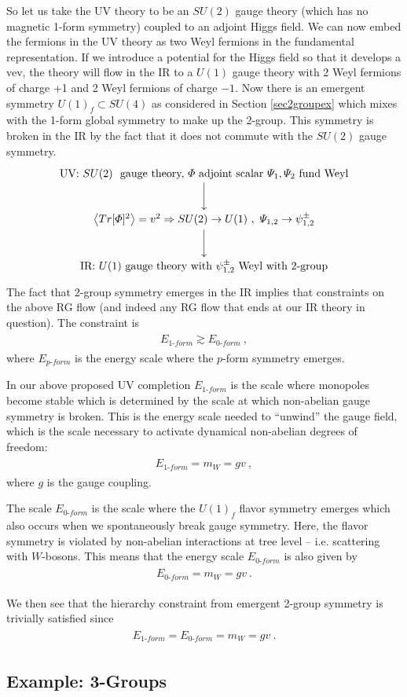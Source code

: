\documentclass[11pt]{article}
\newcommand{\eq}[1]{\begin{align}\begin{split}#1\end{split}\end{align}}
\begin{document}
So let us take the UV theory to be an $SU(2)$ gauge theory (which has no magnetic 1-form symmetry) coupled to an adjoint Higgs field. We can now embed the fermions in the UV theory as two Weyl fermions in the fundamental representation. If we introduce a potential for the Higgs field so that it develops a vev, the theory will flow in the IR to a $U(1)$ gauge theory with 2 Weyl fermions of charge +1 and 2 Weyl fermions of charge $-1$. Now there is an emergent symmetry $U(1)_f\subset SU(4)$ as considered in Section \ref{sec2groupex} which mixes with the 1-form global symmetry to make up the 2-group. This symmetry is broken in the IR by the fact that it does not commute with the $SU(2)$ gauge  symmetry.
\eq{
\xymatrix{
\text{UV: }SU(2)~\text{ gauge theory, }\Phi\text{ adjoint scalar } \Psi_1,\Psi_2\text{ fund Weyl}\ar[d]\\
\big\langle Tr[\Phi]^2\big\rangle= v^2\Rightarrow SU(2)\to U(1)~,~\Psi_{1,2}\to \psi_{1,2}^\pm\ar[d]\\
\text{IR: } U(1)\text{ gauge theory with }\psi_{1,2}^\pm\text{ Weyl with 2-group}
}
}
The fact that 2-group symmetry emerges in the IR implies that constraints on the above RG flow (and indeed any RG flow that ends at our IR theory in question). The constraint is 
\eq{
E_{1\text{-}form}\gtrsim E_{0\text{-}form}~,}
where $E_{p\text{-}form}$ is the energy scale where the $p$-form symmetry emerges.


 In our above proposed UV completion $E_{1\text{-}form}$ is the scale where monopoles become stable which is determined by the scale at which non-abelian gauge symmetry is broken. This is the energy scale needed to ``unwind'' the gauge field, which is the scale necessary to activate dynamical non-abelian degrees of freedom: 
 \eq{
 E_{1\text{-}form}=m_W=gv~,
 }
 where $g$ is the gauge coupling. 
 
The scale $E_{0\text{-}form}$ is the scale where the $U(1)_f$ flavor symmetry emerges which also occurs when we spontaneously break gauge symmetry. Here, the flavor symmetry is violated by non-abelian interactions at tree level -- i.e. scattering with $W$-bosons. This means that   the energy scale $E_{0\text{-}form}$ is also given by 
 \eq{
 E_{0\text{-}form}=m_W=gv~.
 }


We then see that the hierarchy constraint from emergent 2-group symmetry is trivially satisfied since 
\eq{
E_{1\text{-}form}=E_{0\text{-}form}=m_W=gv~. 
}


\subsection{Example: 3-Groups}
\end{document}
